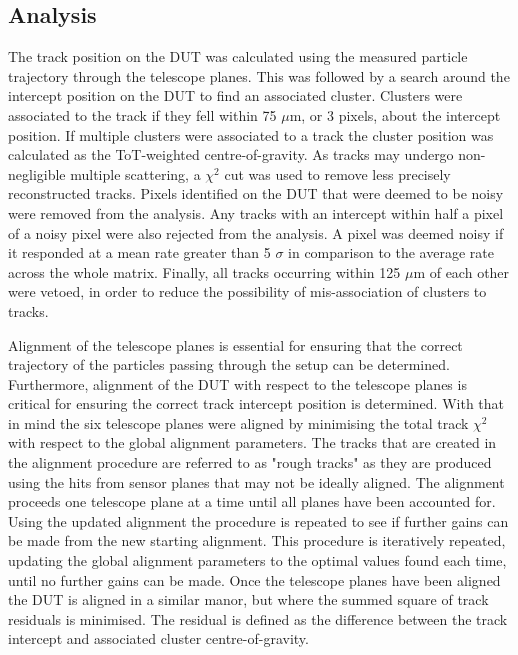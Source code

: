 
\subsection{Analysis}
The track position on the DUT was calculated using the measured particle trajectory through the telescope planes.  This was followed by a search around the intercept position on the DUT to find an associated cluster.  Clusters were associated to the track if they fell within 75 $\mu$m, or 3 pixels, about the intercept position.  If multiple clusters were associated to a track the cluster position was calculated as the ToT-weighted centre-of-gravity.  As tracks may undergo non-negligible multiple scattering, a $\chi^{2}$ cut was used to remove less precisely reconstructed tracks.  Pixels identified on the DUT that were deemed to be noisy were removed from the analysis.  Any tracks with an intercept within half a pixel of a noisy pixel were also rejected from the analysis.  A pixel was deemed noisy if it responded at a mean rate greater than 5 $\sigma$ in comparison to the average rate across the whole matrix.  Finally, all tracks occurring within 125 $\mu$m of each other were vetoed, in order to reduce the possibility of mis-association of clusters to tracks. 

Alignment of the telescope planes is essential for ensuring that the correct trajectory of the particles passing through the setup can be determined.  Furthermore, alignment of the DUT with respect to the telescope planes is critical for ensuring the correct track intercept position is determined.  With that in mind the six telescope planes were aligned by minimising the total track $\chi^{2}$ with respect to the global alignment parameters.  The tracks that are created in the alignment procedure are referred to as "rough tracks" as they are produced using the hits from sensor planes that may not be ideally aligned.  The alignment proceeds one telescope plane at a time until all planes have been accounted for.  Using the updated alignment the procedure is repeated to see if further gains can be made from the new starting alignment.  This procedure is iteratively repeated, updating the global alignment parameters to the optimal values found each time, until no further gains can be made.  Once the telescope planes have been aligned the DUT is aligned in a similar manor, but where the summed square of track residuals is minimised.  The residual is defined as the difference between the track intercept and associated cluster centre-of-gravity.  

